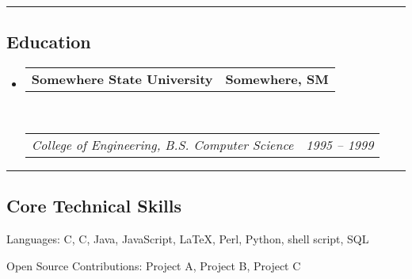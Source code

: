 \documentclass[10pt,letterpaper]{article}
\makeatletter
\newenvironment{indentsection}[1]%
{\begin{list}{}%
	{\setlength{\leftmargin}{#1}}%
	\item[]%
}
{\end{list}}
\newcommand{\headerrow}[2]
{\begin{tabular*}{\linewidth}{l@{\extracolsep{\fill}}r}
	#1 &
	#2 \\
\end{tabular*}}
\newcommand{\CPP}
{C\nolinebreak[4]\hspace{-.05em}\raisebox{.22ex}{\footnotesize\bf ++}}
\makeatother
\begin{document}
\hrule
\vspace{-0.4em}
\subsection*{Education}

\begin{itemize}
	\parskip=0.1em

	\item 
	\headerrow
		{\textbf{Somewhere State University}}
		{\textbf{Somewhere, SM}}
	\\
	\headerrow
		{\emph{College of Engineering, B.S. Computer Science}}
		{\emph{1995 -- 1999}}

\end{itemize}


\hrule
\vspace{-0.4em}
\subsection*{Core Technical Skills}

\begin{indentsection}{\parindent}
\begin{description*}
	\item[Languages:]
	C, \CPP, Java, JavaScript, \LaTeX, Perl, Python, shell script, SQL
	\item[Open Source Contributions:]
	Project A, Project B, Project C
\end{description*}
\end{indentsection}
\end{document}

